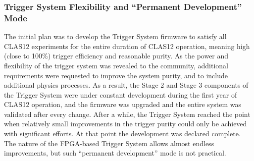 \subsubsection{Trigger System Flexibility and ``Permanent Development'' Mode}

The initial plan was to develop the Trigger System firmware to satisfy all CLAS12 experiments for the entire duration of CLAS12 operation, meaning high (close to 100\%) trigger efficiency and reasonable purity. As the power and flexibility of the trigger system was revealed to the community, additional requirements were requested to improve the system purity, and to include additional physics processes. As a result, the Stage 2 and Stage 3 components of the Trigger System were under constant development during the first year of CLAS12 operation, and the firmware was upgraded and the entire system was validated after every change. After a while, the Trigger System reached the point when relatively small improvements in the trigger purity could only be achieved with significant efforts. At that point the development was declared complete. The nature of the FPGA-based Trigger System allows almost endless improvements, but such ``permanent development'' mode is not practical.

